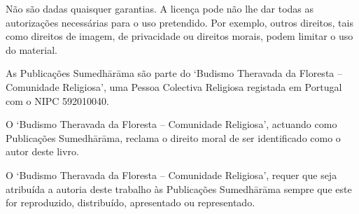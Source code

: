 {Não são dadas quaisquer garantias. A licença pode não lhe dar todas as autorizações necessárias para o uso pretendido. Por exemplo, outros direitos, tais como direitos de imagem, de privacidade ou direitos morais, podem limitar o uso do material.

As Publicações Sumedhārāma são parte do `Budismo Theravada da Floresta -- Comunidade Religiosa', uma Pessoa Colectiva Religiosa registada em Portugal com o NIPC 592010040.

O `Budismo Theravada da Floresta -- Comunidade Religiosa', actuando como Publicações Sumedhārāma, reclama o direito moral de ser identiﬁcado como o autor deste livro.

O `Budismo Theravada da Floresta -- Comunidade Religiosa', requer que seja atribuída a autoria deste trabalho às Publicações Sumedhārāma sempre que este for reproduzido, distribuído, apresentado ou representado.

}
